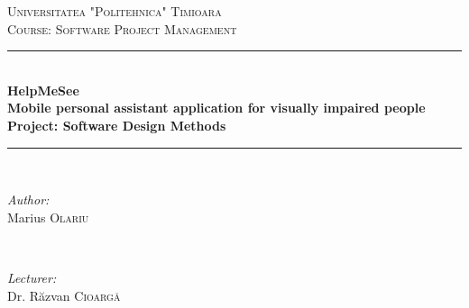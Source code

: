 \documentclass{article}[11]
\begin{document}
\begin{titlepage}

\newcommand{\HRule}{\rule{\linewidth}{0.5mm}} %

\center %
 

\textsc{\LARGE Universitatea "Politehnica" Timioara}\\[1.5cm] %
\textsc{\Large Course: Software Project Management}\\[0.5cm] %

\vspace{3cm}



\HRule \\[0.4cm]
{ \huge \bfseries %
		HelpMeSee\\ \Large
		Mobile personal assistant application for visually impaired people\\
		Project: Software Design Methods
}\\[0.4cm] %
\HRule \\[1.5cm]
 

\begin{minipage}{0.4\textwidth}
\begin{flushleft} \large
\emph{Author:}\\
Marius \textsc{Olariu} %
\end{flushleft}
\end{minipage}
~
\begin{minipage}{0.4\textwidth}
\begin{flushright} \large
\emph{Lecturer:\hspace{2cm}} \\
Dr. Răzvan \textsc{Cioargă} %
\end{flushright}
\end{minipage}\\[2cm]


\end{titlepage}
\end{document}
